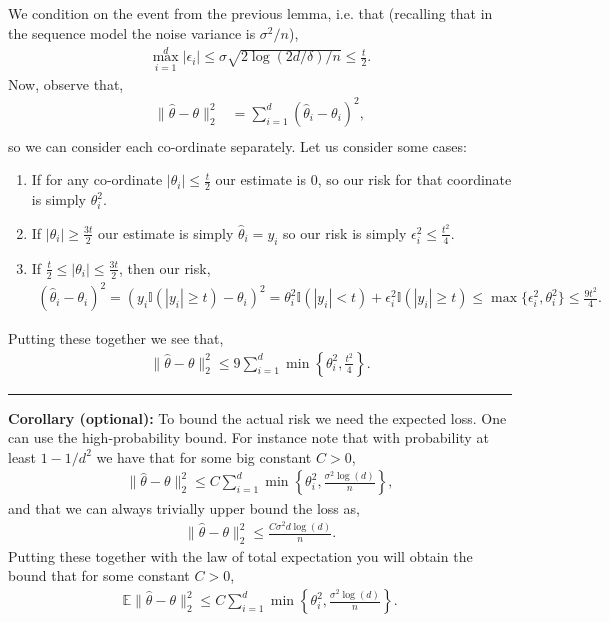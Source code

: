 \documentclass[twoside,12pt]{article}
\newenvironment{proof}{{\bf Proof:}}{\hfill\rule{2mm}{2mm}}
\begin{document}
\begin{proof}
We condition on the event from the previous lemma, i.e. that (recalling that in the sequence model the noise variance is $\sigma^2/n$),
\begin{align*}\max_{i=1}^d |\epsilon_i| \leq \sigma \sqrt{ 2 \log (2d/\delta)/n } \leq \frac{t}{2}.
\end{align*}
Now, observe that,
\begin{align*}
\|\widehat{\theta} - \theta\|_2^2 &= \sum_{i=1}^d (\widehat{\theta}_i - \theta_i)^2, \\
\end{align*}
so we can consider each co-ordinate separately. 
Let us consider some cases:
\begin{enumerate}
\item If for any co-ordinate $|\theta_i| \leq \frac{t}{2}$ our estimate is 0, so our risk for that coordinate is simply $\theta_i^2$. 
\item If $|\theta_i| \geq \frac{3t}{2}$ our estimate is simply $\widehat{\theta}_i = y_i$ so our risk is simply $\epsilon_i^2 \leq \frac{t^2}{4}$.
\item If $\frac{t}{2} \leq |\theta_i| \leq \frac{3t}{2}$, then our risk,
\begin{align*}
(\widehat{\theta}_i - \theta_i)^2 = (y_i \mathbb{I}(|y_i| \geq t) - \theta_i)^2 = \theta_i^2 \mathbb{I}(|y_i| < t) + \epsilon_i^2 \mathbb{I}(|y_i| \geq t) \leq \max\{\epsilon_i^2,\theta_i^2\} \leq \frac{9t^2}{4}.
\end{align*}
\end{enumerate}
Putting these together we see that,
\begin{align*}
\|\widehat{\theta} - \theta\|_2^2 \leq 9 \sum_{i=1}^d \min\left\{\theta_i^2,\frac{t^2}{4}\right\}.
\end{align*}
\end{proof}

{\bf Corollary (optional): } To bound the actual risk we need the expected loss. One can use the high-probability bound. For instance note that with probability at least $1 - 1/d^2$ we have that for some big constant $C > 0$,
\begin{align*}
\|\widehat{\theta} - \theta\|_2^2 \leq  C \sum_{i=1}^d \min\left\{\theta_i^2, \frac{\sigma^2 \log(d)}{n}\right\},
\end{align*}
and that we can always trivially upper bound the loss as,
\begin{align*}
\|\widehat{\theta} - \theta\|_2^2 \leq \frac{C \sigma^2 d \log(d)}{n}.
\end{align*}
Putting these together with the law of total expectation you will obtain the bound that for some constant $C > 0$,
\begin{align*}
\mathbb{E} \|\widehat{\theta} - \theta\|_2^2 \leq  C \sum_{i=1}^d \min\left\{\theta_i^2, \frac{\sigma^2 \log(d)}{n} \right\}.
\end{align*}
\end{document}
